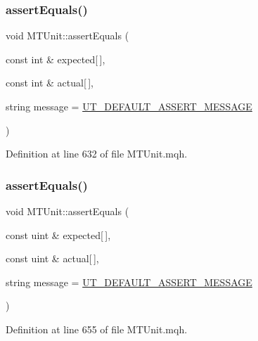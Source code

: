 \subsubsection{\texorpdfstring{assert\+Equals()}{assertEquals()}\hspace{0.1cm}{\footnotesize\ttfamily [20/28]}}
{\footnotesize\ttfamily void M\+T\+Unit\+::assert\+Equals (\begin{DoxyParamCaption}\item[{const int \&}]{expected\mbox{[}$\,$\mbox{]},  }\item[{const int \&}]{actual\mbox{[}$\,$\mbox{]},  }\item[{string}]{message = {\ttfamily \mbox{\hyperlink{_m_t_unit_8mqh_a96f5d62188d09039ebc3f443c9120e39}{U\+T\+\_\+\+D\+E\+F\+A\+U\+L\+T\+\_\+\+A\+S\+S\+E\+R\+T\+\_\+\+M\+E\+S\+S\+A\+GE}}} }\end{DoxyParamCaption})}



Definition at line 632 of file M\+T\+Unit.\+mqh.

\mbox{\label{class_m_t_unit_a7cba3cdcc84f3485aa18ef6d955e82b6}} 
\subsubsection{\texorpdfstring{assert\+Equals()}{assertEquals()}\hspace{0.1cm}{\footnotesize\ttfamily [21/28]}}
{\footnotesize\ttfamily void M\+T\+Unit\+::assert\+Equals (\begin{DoxyParamCaption}\item[{const uint \&}]{expected\mbox{[}$\,$\mbox{]},  }\item[{const uint \&}]{actual\mbox{[}$\,$\mbox{]},  }\item[{string}]{message = {\ttfamily \mbox{\hyperlink{_m_t_unit_8mqh_a96f5d62188d09039ebc3f443c9120e39}{U\+T\+\_\+\+D\+E\+F\+A\+U\+L\+T\+\_\+\+A\+S\+S\+E\+R\+T\+\_\+\+M\+E\+S\+S\+A\+GE}}} }\end{DoxyParamCaption})}



Definition at line 655 of file M\+T\+Unit.\+mqh.

\mbox{\label{class_m_t_unit_a4467d295e5b98ad3d12c558a20ab7490}} 

